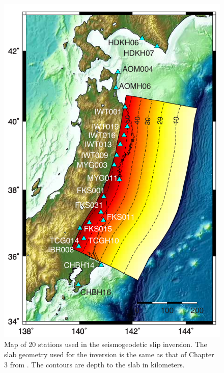 \begin{figure}[!ht] 
  \centering
  \includegraphics[width=0.55\linewidth]{./figures/ch4/kinmap.pdf}
    \caption[Station distribution for kinematic inversion]{Map of 20 stations used in the seismogeodetic slip inversion. The slab geometry used for the inversion is the same as that of Chapter 3 from \citet{hayes2012}. The contours are depth to the slab in kilometers.}
  \label{fig_kinmap}
\end{figure}


